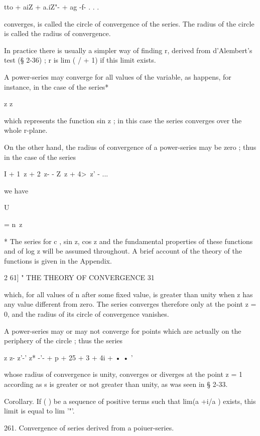 tto + aiZ + a.iZ"- + ag -f- . . .

converges, is called the circle of convergence of the series. The
radius of the circle is called the radius of convergence.

In practice there is usually a simpler way of finding r, derived from
d'Alembert's test (§ 2-36) ; r is lim ( / + 1) if this limit exists.

A power-series may converge for all values of the variable, as
happens, for instance, in the case of the series*

z z

which represents the function sin z ; in this case the series
converges over the whole r-plane.

On the other hand, the radius of convergence of a power-series may be
zero ; thus in the case of the series

I + 1\ z + 2\ z- - Z\ z + 4>\ z' - ...



we have



U



= n\ z



* The series for c , sin z, cos z and the fundamental properties of
these functions and of log z will be assumed throughout. A brief
account of the theory of the functions is given in the Appendix.



2 61] " THE THEORY OF CONVERGENCE 31

which, for all values of n after some fixed value, is greater than
unity when z has any value different from zero. The series converges
therefore only at the point z = 0, and the radius of its circle of
convergence vanishes.

A power-series may or may not converge for points which are actually
on the periphery of the circle ; thus the series

z z- z'-' z* -'- + p + 25 + 3 + 4i + • • '

whose radius of convergence is unity, converges or diverges at the
point z = 1 according as s is greater or not greater than unity, as
was seen in § 2-33.

Corollary. If ( ) be a sequence of positive terms such that lim(a +i/a
) exists, this limit is equal to lim '"'.

261. Convergence of series derived from a poiuer-series.

